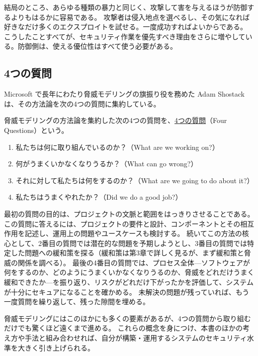 \documentclass[uplatex]{jsarticle}
\def\label#1{}%
\begin{document}
結局のところ、あらゆる種類の暴力と同じく、攻撃して害を与えるほうが防御するよりもはるかに容易である。
攻撃者は侵入地点を選べるし、その気になれば好きなだけ多くのエクスプロイトを試せる。一度成功すればよいからである。
こうしたことすべてが、セキュリティ作業を優先すべき理由をさらに増やしている。防御側は、使える優位性はすべて使う必要がある。

\subsection{4つの質問}\label{subsec:ch2-four-questions}

Microsoft で長年にわたり脅威モデリングの旗振り役を務めた Adam Shostack は、その方法論を次の4つの質問に集約している。

\begin{dfn}[4つの質問]\label{dfn:ch2-four-questions}
脅威モデリングの方法論を集約した次の4つの質問を、\underline{4つの質問}（Four Questions）という。
\begin{enumerate}
\item 私たちは何に取り組んでいるのか？（What are we working on?）
\item 何がうまくいかなくなりうるか？（What can go wrong?）
\item それに対して私たちは何をするのか？（What are we going to do about it?）
\item 私たちはうまくやれたか？（Did we do a good job?）
\end{enumerate}
\end{dfn}

最初の質問の目的は、プロジェクトの文脈と範囲をはっきりさせることである。
この質問に答えるには、プロジェクトの要件と設計、コンポーネントとその相互作用を記述し、運用上の問題やユースケースも検討する。
続いてこの方法の核心として、2番目の質問では潜在的な問題を予期しようとし、3番目の質問では特定した問題への緩和策を探る（緩和策は第3章で詳しく見るが、まず緩和策と脅威の関係を調べる）。
最後の4番目の質問では、プロセス全体---ソフトウェアが何をするのか、どのようにうまくいかなくなりうるのか、脅威をどれだけうまく緩和できたか---を振り返り、リスクがどれだけ下がったかを評価して、システムが十分にセキュアになることを確かめる。
未解決の問題が残っていれば、もう一度質問を繰り返して、残った隙間を埋める。

脅威モデリングにはこのほかにも多くの要素があるが、4つの質問から取り組むだけでも驚くほど遠くまで進める。
これらの概念を身につけ、本書のほかの考え方や手法と組み合わせれば、自分が構築・運用するシステムのセキュリティ水準を大きく引き上げられる。
\end{document}
